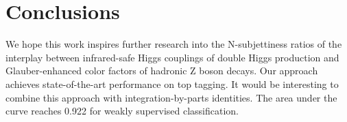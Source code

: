 \section{Conclusions}\label{sec:conclusions}

We hope this work inspires further research into the N-subjettiness
ratios of the interplay between infrared-safe Higgs couplings of double
Higgs production and Glauber-enhanced color factors of hadronic Z boson
decays. Our approach achieves state-of-the-art performance on top
tagging. It would be interesting to combine this approach with
integration-by-parts identities. The area under the curve reaches 0.922
for weakly supervised classification.

